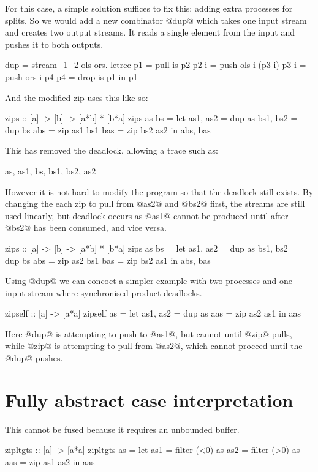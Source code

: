 For this case, a simple solution suffices to fix this: adding extra processes for splits. So we would add a new combinator @dup@ which takes one input stream and creates two output streams. It reads a single element from the input and pushes it to both outputs.

\begin{code}
dup = stream_1_2 \is ols ors.
  letrec
    p1   = pull is p2
    p2 i = push ols i (p3 i)
    p3 i = push ors i p4
    p4   = drop is p1
  in p1
\end{code}
And the modified zip uses this like so:

\begin{code}
zips :: [a] -> [b] -> [a*b] * [b*a]
zips as bs =
  let as1, as2 = dup as
      bs1, bs2 = dup bs
      abs = zip as1 bs1
      bas = zip bs2 as2
  in  abs, bas
\end{code}

This has removed the deadlock, allowing a trace such as:
\begin{code}
as, as1, bs, bs1, bs2, as2
\end{code}

However it is not hard to modify the program so that the deadlock still exists.
By changing the each zip to pull from @as2@ and @bs2@ first, the streams are still used linearly, but deadlock occurs as @as1@ cannot be produced until after @bs2@ has been consumed, and vice versa.
\begin{code}
zips :: [a] -> [b] -> [a*b] * [b*a]
zips as bs =
  let as1, as2 = dup as
      bs1, bs2 = dup bs
      abs = zip as2 bs1
      bas = zip bs2 as1
  in  abs, bas
\end{code}

Using @dup@ we can concoct a simpler example with two processes and one input stream where synchronised product deadlocks.
\begin{code}
zipself :: [a] -> [a*a]
zipself as =
  let as1, as2 = dup as
      aas = zip as2 as1
  in  aas
\end{code}
Here @dup@ is attempting to push to @as1@, but cannot until @zip@ pulls, while @zip@ is attempting to pull from @as2@, which cannot proceed until the @dup@ pushes.

\section{Fully abstract case interpretation}

This cannot be fused because it requires an unbounded buffer.
\begin{code}
zipltgts :: [a] -> [a*a]
zipltgts as =
  let as1 = filter (<0) as
      as2 = filter (>0) as
      aas = zip as1 as2
  in  aas
\end{code}


